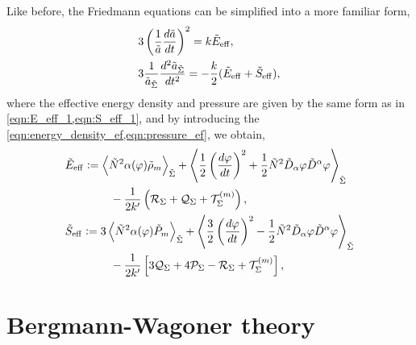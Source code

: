 Like before, the Friedmann equations can be simplified into a more familiar form,
\begin{align}
    &3\left(\frac{1}{\Tilde{a}}\frac{d\Tilde{a}}{dt}\right)^2 = k\tilde{E}_{\mathrm{eff}},\\
    &3\frac{1}{\Tilde{a}_{\Tilde{\Sigma}}}\frac{d^2\Tilde{a}_{\Tilde{\Sigma}}}{dt^2}=-\frac{k}{2}(\tilde{E}_{\mathrm{eff}}+\tilde{S}_{\mathrm{eff}}),
\end{align}
where the effective energy density and pressure are given by the same form as in \cref{eqn:E_eff_1,eqn:S_eff_1}, and by introducing the \cref{eqn:energy_density_ef,eqn:pressure_ef}, we obtain,
\begin{align}
    &\tilde{E}_{\mathrm{eff}} := \left\langle \tilde{N}^2 \alpha(\varphi)\tilde{\rho}_m \right\rangle_{\Tilde{\Sigma}}+\left\langle \frac{1}{2}\left(\frac{d\varphi}{dt}\right)^2+\frac{1}{2}\tilde{N}^2\tilde{D}_\alpha\varphi \tilde{D}^\alpha\varphi\right\rangle_{\tilde{\Sigma}} \\
    &\qquad\qquad-\frac{1}{2k'}\left(\mathcal{R}_\Sigma+\mathcal{Q}_{\Sigma}+\mathcal{T}^{(m)}_{\Sigma}\right),\\
    &\tilde{S}_{\mathrm{eff}} := 3\left\langle \tilde{N}^2 \alpha(\varphi)\tilde{P}_m \right\rangle_{\Tilde{\Sigma}}+\left\langle \frac{3}{2}\left(\frac{d\varphi}{dt}\right)^2-\frac{1}{2}\tilde{N}^2\tilde{D}_\alpha\varphi \tilde{D}^\alpha\varphi\right\rangle_{\tilde{\Sigma}}\\
    &\qquad\qquad-\frac{1}{2k'}\left[3\mathcal{Q}_{\Sigma}+4\mathcal{P}_{\Sigma}-\mathcal{R}_\Sigma+\mathcal{T}^{(m)}_{\Sigma}\right],
\end{align}





\section{Bergmann-Wagoner theory}